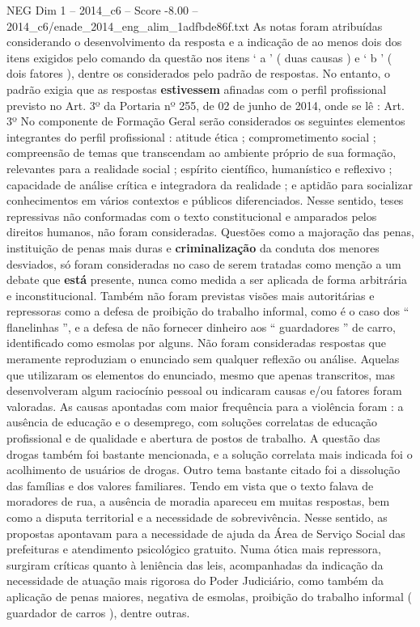 \begin{textsample}{NEG Dim 1 – 2014\_c6 – Score -8.00 – 2014\_c6/enade\_2014\_eng\_alim\_1adfbde86f.txt}
As notas foram atribuídas considerando o desenvolvimento da resposta e a indicação de ao menos dois dos itens exigidos pelo comando da questão nos itens ‘ a ’ ( duas causas ) e ‘ b ’ ( dois fatores ), dentre os considerados pelo padrão de respostas.
No entanto, o padrão exigia que as respostas \textbf{estivessem} afinadas com o perfil profissional previsto no Art. 3º da Portaria nº 255, de 02 de junho de 2014, onde se lê : Art. 3º No componente de Formação Geral serão considerados os seguintes elementos integrantes do perfil profissional : atitude ética ; comprometimento social ; compreensão de temas que transcendam ao ambiente próprio de sua formação, relevantes para a realidade social ; espírito científico, humanístico e reflexivo ; capacidade de análise crítica e integradora da realidade ; e aptidão para socializar conhecimentos em vários contextos e públicos diferenciados.
Nesse sentido, teses repressivas não conformadas com o texto constitucional e amparados pelos direitos humanos, não foram consideradas.
Questões como a majoração das penas, instituição de penas mais duras e \textbf{criminalização} da conduta dos menores desviados, só foram consideradas no caso de serem tratadas como menção a um debate que \textbf{está} presente, nunca como medida a ser aplicada de forma arbitrária e inconstitucional.
Também não foram previstas visões mais autoritárias e repressoras como a defesa de proibição do trabalho informal, como é o caso dos “ flanelinhas ”, e a defesa de não fornecer dinheiro aos “ guardadores ” de carro, identificado como esmolas por alguns.
Não foram consideradas respostas que meramente reproduziam o enunciado sem qualquer reflexão ou análise.
Aquelas que utilizaram os elementos do enunciado, mesmo que apenas transcritos, mas desenvolveram algum raciocínio pessoal ou indicaram causas e/ou fatores foram valoradas.
As causas apontadas com maior frequência para a violência foram : a ausência de educação e o desemprego, com soluções correlatas de educação profissional e de qualidade e abertura de postos de trabalho.
A questão das drogas também foi bastante mencionada, e a solução correlata mais indicada foi o acolhimento de usuários de drogas.
Outro tema bastante citado foi a dissolução das famílias e dos valores familiares.
Tendo em vista que o texto falava de moradores de rua, a ausência de moradia apareceu em muitas respostas, bem como a disputa territorial e a necessidade de sobrevivência.
Nesse sentido, as propostas apontavam para a necessidade de ajuda da Área de Serviço Social das prefeituras e atendimento psicológico gratuito.
Numa ótica mais repressora, surgiram críticas quanto à leniência das leis, acompanhadas da indicação da necessidade de atuação mais rigorosa do Poder Judiciário, como também da aplicação de penas maiores, negativa de esmolas, proibição do trabalho informal ( guardador de carros ), dentre outras.

\end{textsample}

